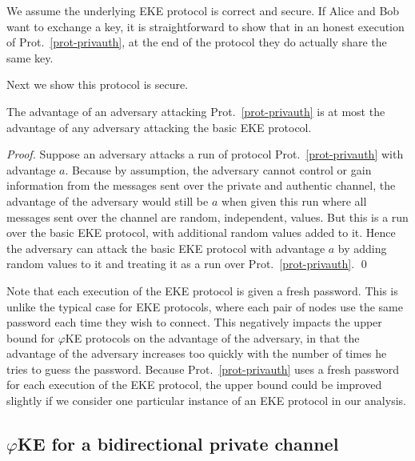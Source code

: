 \documentclass[runningheads,envcountsame,envcountsect,oribibl]{llncs}
\newcommand{\eke}{$\varphi$KE}
\begin{document}
We assume the underlying EKE protocol is correct and secure.
If Alice and Bob want to exchange a key, it is straightforward to show that in
an honest execution of Prot.~\ref{prot-privauth}, at the end of the protocol
they do actually share the same key.

Next we show this protocol is secure.  
\begin{theorem}
\label{th-privauth}
The advantage of an adversary attacking Prot.~\ref{prot-privauth} is at most
the advantage of any adversary attacking the basic EKE protocol.
\end{theorem}
\begin{proof}
Suppose an adversary attacks a run of protocol Prot.~\ref{prot-privauth} with
advantage $a$. Because by assumption, the adversary cannot control or gain
information from the messages sent over the private and authentic channel, the
advantage of the adversary would still be $a$ when given this run where all
messages sent over the channel are random, independent, values. 
But this is a run over the basic EKE protocol, with additional random values
added to it. Hence the adversary can attack the basic EKE protocol with
advantage $a$ by adding random values to it and treating it as a run over
Prot.~\ref{prot-privauth}.
\qed
\end{proof}
Note that each execution of the EKE protocol is given a fresh password. This is
unlike the typical case for EKE protocols, where each pair of nodes use the
same password each time they wish to connect. This negatively impacts the upper
bound for \eke{} protocols on the advantage of the adversary, in that the
advantage of the adversary increases too quickly with the number of times he
tries to guess the password. Because Prot.~\ref{prot-privauth} uses a fresh
password for each execution of the EKE protocol, the upper bound could be
improved slightly if we consider one particular instance of an EKE protocol in
our analysis.

\subsection{\eke{} for a bidirectional private channel}
\end{document}

